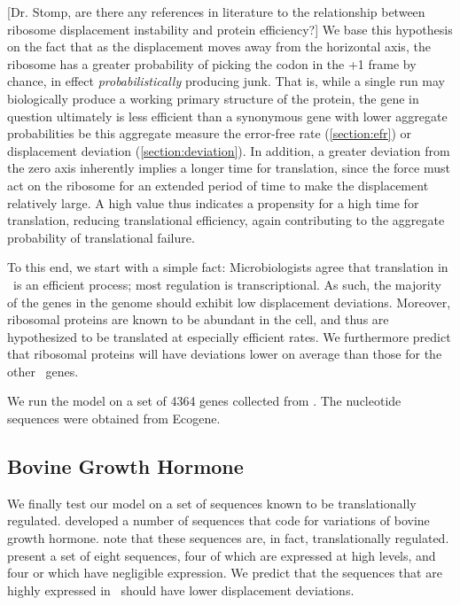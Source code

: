 \documentclass[12pt]{article}
\numberwithin{equation}{section}
\begin{document}
[Dr. Stomp, are there any references in literature to the relationship
  between ribosome displacement instability and protein efficiency?]
We base this hypothesis on the fact that as the displacement moves
away from the horizontal axis, the ribosome has a greater probability
of picking the codon in the +1 frame by chance, in effect
\emph{probabilistically} producing junk. That is, while a single run
may biologically produce a working primary structure of the protein,
the gene in question ultimately is less efficient than a synonymous gene
with lower aggregate probabilities be this aggregate measure the
error-free rate (\autoref{section:efr}) or displacement deviation
(\autoref{section:deviation}). In addition, a greater deviation from
the zero axis inherently implies a longer time for translation, since
the force must act on the ribosome for an extended period of time to
make the displacement relatively large.  A high value thus
indicates a propensity for a high time for translation, reducing
translational efficiency, again contributing to the aggregate
probability of translational failure.

To this end, we start with a simple fact:
Microbiologists agree that translation in \ecoli\ is an efficient process;
most regulation is transcriptional.  As such, the majority of the genes 
in the genome should exhibit low displacement deviations.  Moreover,
ribosomal proteins are known to be abundant in the cell, and thus
are hypothesized to be translated at especially efficient rates.  We
furthermore predict that ribosomal proteins will have deviations lower
on average than those for the other \ecoli\ genes.

We run the model on a set of 4364 genes collected from \ecoli.  The
nucleotide sequences were obtained from Ecogene.

\subsection{Bovine Growth Hormone}
We finally test our model on a set of sequences known to be translationally 
regulated.  \citet{schoner:bgh} developed a number of sequences that
code for variations of bovine growth hormone. \citeauthor{schoner:bgh}
note that these sequences are, in fact, translationally regulated.
\citeauthor{schoner:bgh} present a set of eight sequences, four of which
are expressed at high levels, and four or which have negligible expression.
We predict that the sequences that are highly expressed in
\ecoli\ should have lower displacement deviations.
\end{document}
